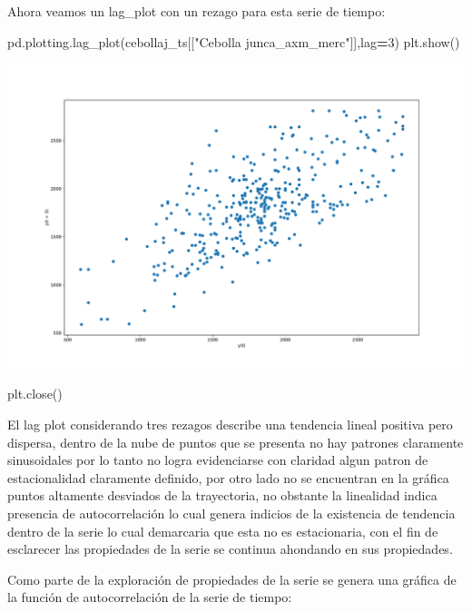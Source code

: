 \documentclass[
]{book}
\newenvironment{Shaded}{\begin{snugshade}}{\end{snugshade}}
\newcommand{\DecValTok}[1]{\textcolor[rgb]{0.00,0.00,0.81}{#1}}
\newcommand{\NormalTok}[1]{#1}
\newcommand{\OperatorTok}[1]{\textcolor[rgb]{0.81,0.36,0.00}{\textbf{#1}}}
\newcommand{\StringTok}[1]{\textcolor[rgb]{0.31,0.60,0.02}{#1}}
\begin{document}
Ahora veamos un lag\_plot con un rezago para esta serie de tiempo:

\begin{Shaded}
\begin{Highlighting}[]

\NormalTok{pd.plotting.lag\_plot(cebollaj\_ts[[}\StringTok{"Cebolla junca\_axm\_merc"}\NormalTok{]],lag}\OperatorTok{=}\DecValTok{3}\NormalTok{)}
\NormalTok{plt.show()}
\end{Highlighting}
\end{Shaded}

\includegraphics{bookdown-demo_files/figure-latex/unnamed-chunk-56-17.pdf}

\begin{Shaded}
\begin{Highlighting}[]
\NormalTok{plt.close()}
\end{Highlighting}
\end{Shaded}

El lag plot considerando tres rezagos describe una tendencia lineal positiva pero dispersa, dentro de la nube de puntos que se presenta no hay patrones claramente sinusoidales por lo tanto no logra evidenciarse con claridad algun patron de estacionalidad claramente definido, por otro lado no se encuentran en la gráfica puntos altamente desviados de la trayectoria, no obstante la linealidad indica presencia de autocorrelación lo cual genera indicios de la existencia de tendencia dentro de la serie lo cual demarcaria que esta no es estacionaria, con el fin de esclarecer las propiedades de la serie se continua ahondando en sus propiedades.

Como parte de la exploración de propiedades de la serie se genera una gráfica de la función de autocorrelación de la serie de tiempo:
\end{document}
